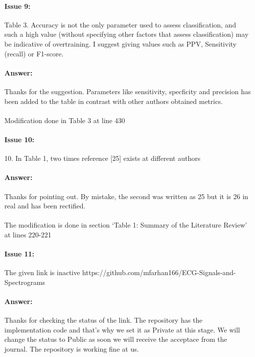 \documentclass{article}
\begin{document}
\paragraph{Issue 9:}
\begin{displayquote}
Table 3. Accuracy is not the only parameter used to assess classification, and such a high value (without specifying other factors that assess classification) may be indicative of overtraining. I suggest giving values such as PPV, Sensitivity (recall) or F1-score.
\end{displayquote}

\paragraph{Answer:}
Thanks for the suggestion. Parameters like sensitivity, specficity and precision has been added to the table in contrast with other authors obtained metrics. \\\\

Modification done in Table 3 at line 430

\paragraph{Issue 10:}
\begin{displayquote}
10. In Table 1, two times reference [25] exists at different authors
\end{displayquote}

\paragraph{Answer:}
Thanks for pointing out. By mistake, the second was written as 25 but it is 26 in real and has been rectified.\\\\

The modification is done in section `Table 1: Summary of the Literature Review' at lines 220-221
\paragraph{Issue 11:}
\begin{displayquote}
The given link is inactive https://github.com/mfarhan166/ECG-Signals-and-Spectrograms
\end{displayquote}

\paragraph{Answer:}
Thanks for checking the status of the link. The repository has the implementation code and that's why we set it as Private at this stage. We will change the status to Public as soon we will receive the acceptace from the journal. The repository is working fine at us.
\end{document}
